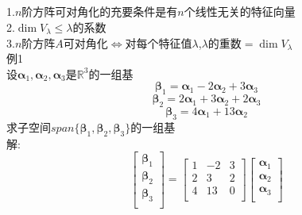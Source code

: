 \documentclass[11pt, a4paper, UTF8]{ctexart}
\begin{document}
\subsection{}
1.$n$阶方阵可对角化的充要条件是有$n$个线性无关的特征向量\\
2.$\dim V_\lambda\le\lambda$的系数\\
3.$n$阶方阵$A$可对角化$\Leftrightarrow$对每个特征值$\lambda$,$\lambda$的重数$=\dim V_\lambda$\\
例1\\
设$\bm\alpha_1,\bm\alpha_2,\bm\alpha_3$是$\mathbb{R}^3$的一组基
\[\bm\beta_1=\bm\alpha_1-2\bm\alpha_2+3\bm\alpha_3\]
\[\bm\beta_2=2\bm\alpha_1+3\bm\alpha_2+2\bm\alpha_3\]
\[\bm\beta_3=4\bm\alpha_1+13\bm\alpha_2\]
求子空间$span\{\bm\beta_1,\bm\beta_2,\bm\beta_3\}$的一组基\\
解:\\
\[\begin{bmatrix}
\bm\beta_1\\
\bm\beta_2\\
\bm\beta_3\\
\end{bmatrix}=\begin{bmatrix}
1&-2&3\\
2&3&2\\
4&13&0\\
\end{bmatrix}\begin{bmatrix}
\bm\alpha_1\\
\bm\alpha_2\\
\bm\alpha_3\\
\end{bmatrix}\]
\[\]
\end{document}
